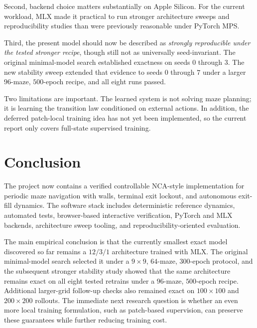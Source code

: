 \documentclass[11pt]{article}
\begin{document}
Second, backend choice matters substantially on Apple Silicon. For the current workload, MLX made it practical to run stronger architecture sweeps and reproducibility studies than were previously reasonable under PyTorch MPS.

Third, the present model should now be described as \emph{strongly reproducible under the tested stronger recipe}, though still not as universally seed-invariant. The original minimal-model search established exactness on seeds \(0\) through \(3\). The new stability sweep extended that evidence to seeds \(0\) through \(7\) under a larger \(96\)-maze, \(500\)-epoch recipe, and all eight runs passed.

Two limitations are important. The learned system is not solving maze planning; it is learning the transition law conditioned on external actions. In addition, the deferred patch-local training idea has not yet been implemented, so the current report only covers full-state supervised training.

\section{Conclusion}
The project now contains a verified controllable NCA-style implementation for periodic maze navigation with walls, terminal exit lockout, and autonomous exit-fill dynamics. The software stack includes deterministic reference dynamics, automated tests, browser-based interactive verification, PyTorch and MLX backends, architecture sweep tooling, and reproducibility-oriented evaluation.

The main empirical conclusion is that the currently smallest exact model discovered so far remains a \(12/3/1\) architecture trained with MLX. The original minimal-model search selected it under a \(9\times 9\), \(64\)-maze, \(300\)-epoch protocol, and the subsequent stronger stability study showed that the same architecture remains exact on all eight tested retrains under a \(96\)-maze, \(500\)-epoch recipe. Additional larger-grid follow-up checks also remained exact on \(100\times 100\) and \(200\times 200\) rollouts. The immediate next research question is whether an even more local training formulation, such as patch-based supervision, can preserve these guarantees while further reducing training cost.
\end{document}
